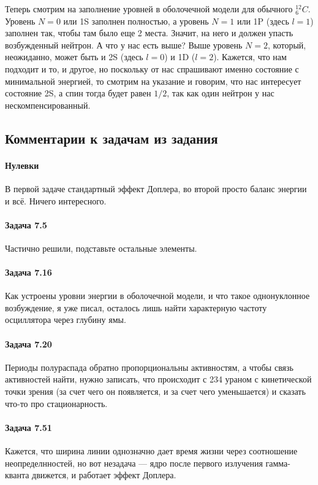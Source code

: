 \documentclass[12pt]{article}
\begin{document}
\vspace{1em} \noindent
Теперь смотрим на заполнение уровней в оболочечной модели для обычного ${}^{12}_6C$. Уровень $N=0$ или 1S заполнен полностью, а уровень $N=1$ или 1P (здесь $l=1$) заполнен так, чтобы там было еще 2 места. Значит, на него и должен упасть возбужденный нейтрон. А что у нас есть выше? Выше уровень $N=2$, который, неожиданно, может быть и 2S (здесь $l=0$) и 1D ($l=2$). Кажется, что нам подходит и то, и другое, но поскольку от нас спрашивают именно состояние с минимальной энергией, то смотрим на указание и говорим, что нас интересует состояние 2S, а спин тогда будет равен $1/2$, так как один нейтрон у нас нескомпенсированный.


\subsection{Комментарии к задачам из задания}
\paragraph{Нулевки} В первой задаче стандартный эффект Доплера, во второй просто баланс энергии и всё. Ничего интересного.
\paragraph{Задача 7.5} Частично решили, подставьте остальные элементы.
\paragraph{Задача 7.16} Как устроены уровни энергии в оболочечной модели, и что такое однонуклонное возбуждение, я уже писал, осталось лишь найти характерную частоту осциллятора через глубину ямы.
\paragraph{Задача 7.20} Периоды полураспада обратно пропорциональны активностям, а чтобы связь активностей найти, нужно записать, что происходит с 234 ураном с кинетической точки зрения (за счет чего он появляется, и за счет чего уменьшается) и сказать что-то про стационарность.
\paragraph{Задача 7.51} Кажется, что ширина линии однозначно дает время жизни через соотношение неопределнностей, но вот незадача --- ядро после первого излучения гамма-кванта движется, и работает эффект Доплера.
\end{document}
